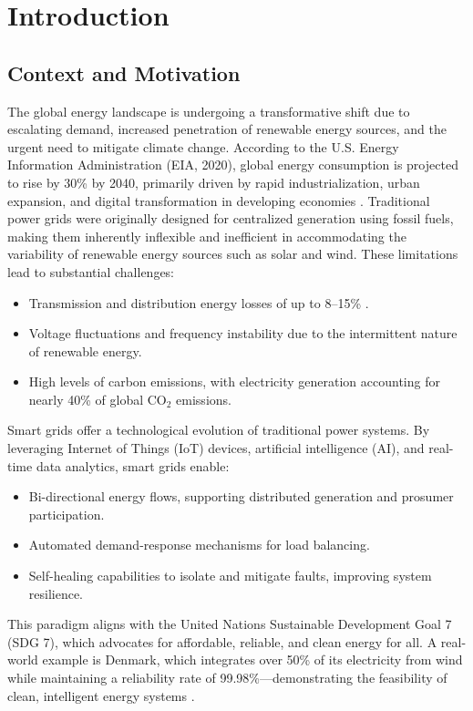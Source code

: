 \documentclass[12pt]{report}
\begin{document}
\tableofcontents
{}

\listoffigures
{}

\listoftables
{}

\chapter{Introduction}
\thispagestyle{empty}
\section{Context and Motivation}
\begin{doublespace}
The global energy landscape is undergoing a transformative shift due to escalating demand, increased penetration of renewable energy sources, and the urgent need to mitigate climate change. According to the U.S. Energy Information Administration (EIA, 2020), global energy consumption is projected to rise by 30\% by 2040, primarily driven by rapid industrialization, urban expansion, and digital transformation in developing economies \cite{EIA2020}. Traditional power grids were originally designed for centralized generation using fossil fuels, making them inherently inflexible and inefficient in accommodating the variability of renewable energy sources such as solar and wind. These limitations lead to substantial challenges:
\begin{itemize}
    \item Transmission and distribution energy losses of up to 8–15\% \cite{IEA2021}.
    \item Voltage fluctuations and frequency instability due to the intermittent nature of renewable energy.
    \item High levels of carbon emissions, with electricity generation accounting for nearly 40\% of global CO$_2$ emissions.
\end{itemize}
Smart grids offer a technological evolution of traditional power systems. By leveraging Internet of Things (IoT) devices, artificial intelligence (AI), and real-time data analytics, smart grids enable:
\begin{itemize}
    \item Bi-directional energy flows, supporting distributed generation and prosumer participation.
    \item Automated demand-response mechanisms for load balancing.
    \item Self-healing capabilities to isolate and mitigate faults, improving system resilience.
\end{itemize}
This paradigm aligns with the United Nations Sustainable Development Goal 7 (SDG 7), which advocates for affordable, reliable, and clean energy for all. A real-world example is Denmark, which integrates over 50\% of its electricity from wind while maintaining a reliability rate of 99.98\%—demonstrating the feasibility of clean, intelligent energy systems \cite{Denmark2020}.
\end{doublespace}
\end{document}
